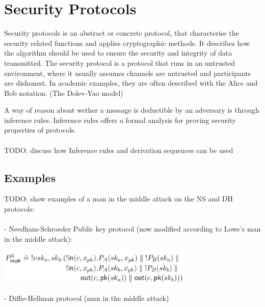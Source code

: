 \section{Security Protocols} %
Security protocols is an abstract or concrete protocol, that characterise the security related functions and applies cryptographic methods. It describes how the algorithm should be used to ensure the security and integrity of data transmitted. The security protocol is a protocol that runs in an untrusted environment, where it usually assumes channels are untrusted and participants are dishonest. In academic examples, they are often described with the Alice and Bob notation. (The Dolev-Yao model) 

A way of reason about wether a message is deductible by an adversary is through inference rules. Inference rules offers a formal analysis for proving security properties of protocols. \\ \\
TODO: discuss how Inference rules and derivation sequences can be used 


\subsection{Examples}
TODO: show examples of a man in the middle attack on the NS and DH protocols: \\ \\
- Needham-Schroeder Public key protocol (now modified according to Lowe's man in the middle attack): 
\begin{center}
\includegraphics[width=0.7\textwidth, angle=0]{Graphics/Needham_Schroeder_Lowe.pdf}
\end{center}
- Diffie-Hellman protocol (man in the middle attack)

